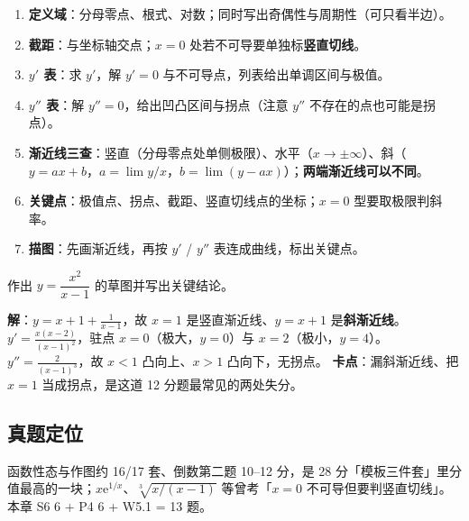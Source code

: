 \documentclass[11pt,a4paper]{ctexart}
\newcommand{\ee}{\mathrm{e}}
\begin{document}
\begin{enumerate}
\item \textbf{定义域}：分母零点、根式、对数；同时写出奇偶性与周期性（可只看半边）。
\item \textbf{截距}：与坐标轴交点；$x=0$ 处若不可导要单独标\textbf{竖直切线}。
\item \textbf{$y'$ 表}：求 $y'$，解 $y'=0$ 与不可导点，列表给出单调区间与极值。
\item \textbf{$y''$ 表}：解 $y''=0$，给出凹凸区间与拐点（注意 $y''$ 不存在的点也可能是拐点）。
\item \textbf{渐近线三查}：竖直（分母零点处单侧极限）、水平（$x\to\pm\infty$）、斜（$y=ax+b$，$a=\lim y/x$，$b=\lim(y-ax)$）；\textbf{两端渐近线可以不同}。
\item \textbf{关键点}：极值点、拐点、截距、竖直切线点的坐标；$x=0$ 型要取极限判斜率。
\item \textbf{描图}：先画渐近线，再按 $y'$ / $y''$ 表连成曲线，标出关键点。
\end{enumerate}

\begin{keypoint}
作出 $y=\dfrac{x^{2}}{x-1}$ 的草图并写出关键结论。

\noindent\textbf{解}：$y=x+1+\frac{1}{x-1}$，故 $x=1$ 是竖直渐近线、$y=x+1$ 是\textbf{斜渐近线}。
$y'=\frac{x(x-2)}{(x-1)^{2}}$，驻点 $x=0$（极大，$y=0$）与 $x=2$（极小，$y=4$）。
$y''=\frac{2}{(x-1)^{3}}$，故 $x<1$ 凸向上、$x>1$ 凸向下，无拐点。
\textbf{卡点}：漏斜渐近线、把 $x=1$ 当成拐点，是这道 12 分题最常见的两处失分。
\end{keypoint}

\subsection{真题定位}
函数性态与作图约 16/17 套、倒数第二题 10--12 分，是 28 分「模板三件套」里分值最高的一块；$x\ee^{1/x}$、$\sqrt[3]{x/(x-1)}$ 等曾考「$x=0$ 不可导但要判竖直切线」。本章 S6 6 + P4 6 + W5.1 = 13 题。
\end{document}
